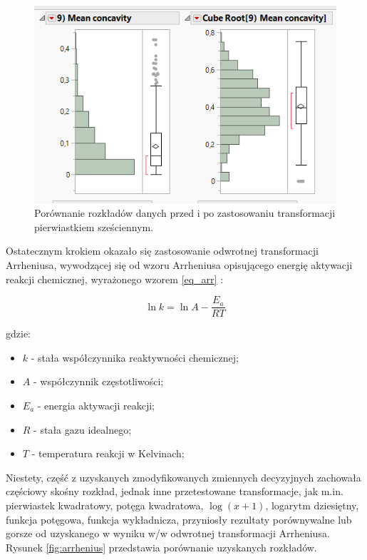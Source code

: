 \begin{figure}[!ht]
	\centering
	\includegraphics[width=0.7\linewidth]{Rysunki/Rozdzial3/cube_root}
	\caption{Porównanie rozkładów danych przed i po zastosowaniu transformacji pierwiastkiem sześciennym.}
	\label{fig:cuberoot}
\end{figure}

	Ostatecznym krokiem okazało się zastosowanie odwrotnej transformacji Arrheniusa, wywodzącej się od wzoru Arrheniusa opisującego energię aktywacji reakcji chemicznej, wyrażonego wzorem \ref{eq_arr} \cite{arr}: 
	
	\begin{equation}
		\ln k = \ln A - \frac{E_a}{RT}
		\label{eq_arr}
	\end{equation}

	gdzie: 
	\begin{itemize}
		\item $k$ - stała współczynnika reaktywności chemicznej;
		\item $A$ - współczynnik częstotliwości;
		\item $E_a$ - energia aktywacji reakcji;
		\item $R$ - stała gazu idealnego;
		\item $T$ - temperatura reakcji w Kelvinach;
	\end{itemize}
	
	Niestety, część z uzyskanych zmodyfikowanych zmiennych decyzyjnych zachowała częściowy skośny rozkład, jednak inne przetestowane transformacje, jak m.in. pierwiastek kwadratowy, potęga kwadratowa, $\log(x+1)$, logarytm dziesiętny, funkcja potęgowa, funkcja wykładnicza, przyniosły rezultaty porównywalne lub gorsze od uzyskanego w wyniku w/w odwrotnej transformacji Arrheniusa. Rysunek \ref{fig:arrhenius} przedstawia porównanie uzyskanych rozkładów.
	

